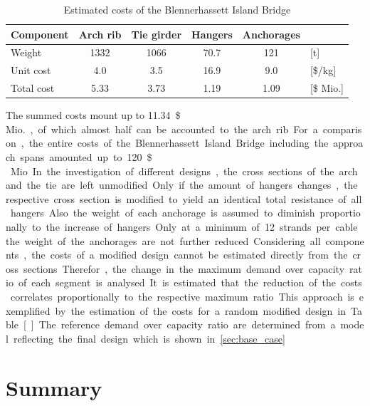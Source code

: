 \begin{table}[H]
    \centering
    \caption{Estimated costs of the Blennerhassett Island Bridge}
    \label{tab:cost_example}
    \begin{tabular}{lccccl}
    \toprule
    Component & Arch rib & Tie girder & Hangers & Anchorages &  \\ \midrule
    Weight & \SI{1332}{} & \SI{1066}{} & \SI{70.7}{} & \SI{121}{} & {[}t{]} \\
    Unit cost & \SI{4.0}{} & \SI{3.5}{} & \SI{16.9}{} & \SI{9.0}{} & {[}\$/kg{]} \\
    Total cost & \SI{5.33}{} & \SI{3.73}{} & \SI{1.19}{} & \SI{1.09}{} & [\$ Mio.] \\ \bottomrule
    \end{tabular}
\end{table}

The summed costs mount up to \SI{11.34}{\$\,Mio.}, of which almost half can be accounted to the arch rib. For a comparison, the entire costs of the Blennerhassett Island Bridge including the approach spans amounted up to \SI{120}{\$\,Mio}. In the investigation of different designs, the cross sections of the arch and the tie are left unmodified. Only if the amount of hangers changes, the respective cross section is modified to yield an identical total resistance of all hangers. Also the weight of each anchorage is assumed to diminish proportionally to the increase of hangers. Only at a minimum of 12 strands per cable the weight of the anchorages are not further reduced. Considering all components, the costs of a modified design cannot be estimated directly from the cross sections. Therefor, the change in the maximum demand over capacity ratio of each segment is analysed. It is estimated that the reduction of the costs correlates proportionally to the respective maximum ratio. This approach is exemplified by the estimation of the costs for a random modified design in Table []. The reference demand over capacity ratio are determined from a model reflecting the final design which is shown in \ref{sec:base_case}
\newpage
\section{Summary}